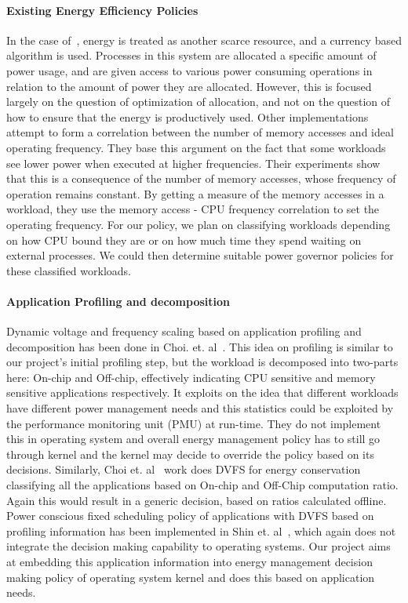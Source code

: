 \paragraph{Existing Energy Efficiency Policies} In the case of~\cite{ecos}, energy is treated as another scarce resource, and a currency based algorithm is used. Processes in this system are allocated a specific amount of power usage, and are given access to various power consuming operations in relation to the amount of power they are allocated. However, this is focused largely on the question of optimization of allocation, and not on the question of how to ensure that the energy is productively used.
Other implementations~\cite{and-dvfs, decomp} attempt to form a correlation between the number of memory accesses and ideal operating frequency. They base this argument on the fact that some workloads see lower power when executed at higher frequencies. Their experiments show that this is a consequence of the number of memory accesses, whose frequency of operation remains constant. By getting a measure of the memory accesses in a workload, they use the memory access - CPU frequency correlation to set the operating frequency.
For our policy, we plan on classifying workloads depending on how CPU bound they are or on how much time they spend waiting on external processes. We could then determine suitable power governor policies for these classified workloads. 

\paragraph{Application Profiling and decomposition} 	Dynamic voltage and frequency scaling based on application profiling and decomposition has been done in Choi. et. al~\cite{decomp}. This idea on profiling is similar to our project’s initial profiling step, but the workload is decomposed into two-parts here: On-chip and Off-chip, effectively indicating CPU sensitive and memory sensitive applications respectively. It exploits on the idea that different workloads have different power management needs and this statistics could be exploited by the performance monitoring unit (PMU) at run-time. They do not implement this in operating system and  overall energy management policy has to still go through kernel and the kernel may decide to override the policy based on its decisions. Similarly, Choi et. al~\cite{choi2005fine} work does DVFS for energy conservation classifying all the applications based on On-chip and Off-Chip computation ratio. Again this would result in a generic decision, based on ratios calculated offline. Power conscious fixed scheduling policy of applications with DVFS based on profiling information has been implemented in Shin et. al~\cite{shin1999power}, which again does not integrate the decision making capability to operating systems. Our project aims at embedding this application information into energy management decision making policy of operating system kernel and does this based on application needs. 
